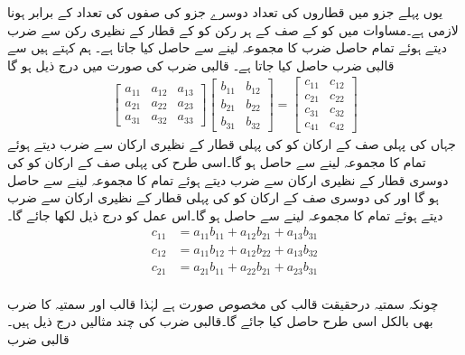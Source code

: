 یوں پہلے جزو  میں قطاروں کی تعداد  دوسرے جزو  کی صفوں کی تعداد  کے برابر ہونا لازمی ہے۔مساوات  میں  کو  کے  صف کے ہر رکن کو  کے  قطار کے نظیری رکن سے ضرب دیتے ہوئے تمام  حاصل ضرب کا مجموعہ لینے سے حاصل کیا جاتا ہے۔ ہم کہتے ہیں  سے قالبی ضرب حاصل کیا جاتا ہے۔ قالبی ضرب  کی صورت میں درج ذیل ہو گا
\begin{align*}
\begin{bmatrix}
a_{11}& a_{12} & a_{13}\\
a_{21}& a_{22} & a_{23}\\
a_{31}& a_{32} & a_{33}
\end{bmatrix}
\begin{bmatrix}
b_{11}& b_{12}\\
b_{21}& b_{22}\\
b_{31}& b_{32}
\end{bmatrix}=
\begin{bmatrix}
c_{11} & c_{12}\\
c_{21} & c_{22}\\
c_{31} & c_{32}\\
c_{41} & c_{42}
\end{bmatrix}
\end{align*}
جہاں  کی پہلی صف کے ارکان کو  کی پہلی قطار کے نظیری ارکان سے ضرب دیتے ہوئے تمام کا مجموعہ لینے سے  حاصل ہو گا۔اسی طرح  کی پہلی صف کے ارکان کو  کی دوسری قطار کے نظیری ارکان سے ضرب دیتے ہوئے تمام کا مجموعہ لینے سے  حاصل ہو گا اور   کی دوسری صف کے ارکان کو  کی پہلی قطار کے نظیری ارکان سے ضرب دیتے ہوئے تمام کا مجموعہ لینے سے  حاصل ہو گا۔اس عمل کو درج ذیل لکھا جائے گا۔
\begin{align*}
c_{11}&=a_{11}b_{11}+a_{12}b_{21}+a_{13}b_{31}\\
c_{12}&=a_{11}b_{12}+a_{12}b_{22}+a_{13}b_{32}\\
c_{21}&=a_{21}b_{11}+a_{22}b_{21}+a_{23}b_{31}\\
\end{align*}
 
چونکہ سمتیہ درحقیقت قالب کی مخصوص صورت ہے لہٰذا قالب اور سمتیہ کا ضرب بھی بالکل اسی طرح حاصل کیا جائے گا۔قالبی ضرب کی چند مثالیں درج ذیل ہیں۔
\quad قالبی ضرب\\


